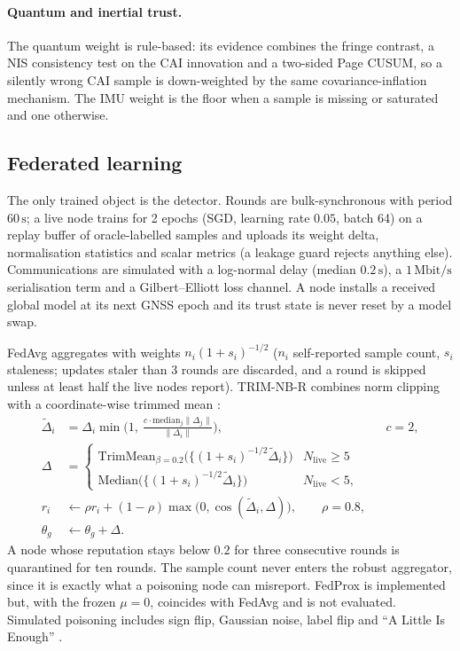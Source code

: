\documentclass[12pt,a4paper]{article}
\begin{document}
\paragraph{Quantum and inertial trust.}
The quantum weight is rule-based: its evidence combines the fringe contrast, a NIS consistency test on the CAI innovation and a two-sided Page CUSUM, so a silently wrong CAI sample is down-weighted by the same covariance-inflation mechanism. The IMU weight is the floor when a sample is missing or saturated and one otherwise.

\subsection{Federated learning}
\label{sec:fl}
The only trained object is the detector. Rounds are bulk-synchronous with period $60\,\mathrm{s}$; a live node trains for 2 epochs (SGD, learning rate $0.05$, batch 64) on a replay buffer of oracle-labelled samples and uploads its weight delta, normalisation statistics and scalar metrics (a leakage guard rejects anything else). Communications are simulated with a log-normal delay (median $0.2\,\mathrm{s}$), a $1\,\mathrm{Mbit/s}$ serialisation term and a Gilbert--Elliott loss channel. A node installs a received global model at its next GNSS epoch and its trust state is never reset by a model swap.

FedAvg \cite{mcmahan2017fedavg} aggregates with weights $n_i(1+s_i)^{-1/2}$ ($n_i$ self-reported sample count, $s_i$ staleness; updates staler than 3 rounds are discarded, and a round is skipped unless at least half the live nodes report). TRIM-NB-R combines norm clipping \cite{sun2019really} with a coordinate-wise trimmed mean \cite{yin2018byzantine}:
\begin{align}
\tilde\Delta_i &= \Delta_i\min\!\Big(1,\ \frac{c\cdot\mathrm{median}_j\lVert\Delta_j\rVert}{\lVert\Delta_i\rVert}\Big), && c=2,\label{eq:clip}\\
\Delta &= \begin{cases}\mathrm{TrimMean}_{\beta=0.2}\big(\{(1+s_i)^{-1/2}\tilde\Delta_i\}\big) & N_{\mathrm{live}}\ge5\\ \mathrm{Median}\big(\{(1+s_i)^{-1/2}\tilde\Delta_i\}\big) & N_{\mathrm{live}}<5,\end{cases}\label{eq:trim}\\
r_i &\leftarrow \rho r_i+(1-\rho)\max\!\big(0,\cos(\tilde\Delta_i,\Delta)\big),\qquad\rho=0.8,\label{eq:reputation}\\
\theta_g &\leftarrow \theta_g+\Delta.\label{eq:serverstep}
\end{align}
A node whose reputation stays below $0.2$ for three consecutive rounds is quarantined for ten rounds. The sample count never enters the robust aggregator, since it is exactly what a poisoning node can misreport. FedProx \cite{li2020fedprox} is implemented but, with the frozen $\mu=0$, coincides with FedAvg and is not evaluated. Simulated poisoning includes sign flip, Gaussian noise, label flip and ``A Little Is Enough'' \cite{baruch2019alie}.
\end{document}
